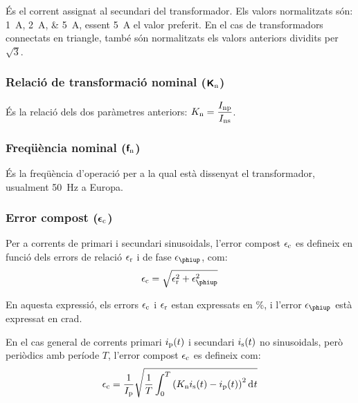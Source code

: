  És el corrent assignat al
secundari del transformador. Els valors normalitzats
són: \qtylist{1;2;5}{A}, essent \qty{5}{A} el valor preferit. En el cas de transformadors connectats en triangle, també són normalitzats els valors anteriors dividits per $ \sqrt{3}$.

\subsubsection{Relació de transformació nominal (${\boldsymbol{\mathsf{K_\text{n}}}}$)}

És la relació dels dos  paràmetres anteriors: $K_\mathrm{n} = \dfrac{I_\mathrm{np}}{I_\mathrm{ns}}$.

\subsubsection{Freqüència nominal (${\boldsymbol{\mathsf{f_\text{n}}}}$)}

 És la freqüència d'operació per a la qual    està dissenyat el transformador, usualment \qty{50}{Hz} a Europa.

\subsubsection{Error compost (${\boldsymbol{\mathsf{\epsilon_\text{c}}}}$)}

Per a corrents de primari i secundari sinusoidals, l'error compost $\epsilon_\mathrm{c}$ es defineix  en funció dels errors de relació $\epsilon_\mathrm{r}$ i de fase  $\epsilon\ped{\phiup}$, com:
\begin{equation}
    \epsilon\ped{c} = \sqrt{\epsilon\ped{r}^2 +  \epsilon\ped{\phiup}^2}
\end{equation}

En aquesta expressió, els errors $\epsilon_\mathrm{c}$ i $\epsilon_\mathrm{r}$  estan expressats en \si{\percent}, i l'error $\epsilon\ped{\phiup}$ està expressat en crad.

En el cas general de corrents primari $i_\mathrm{p}(t)$ i secundari $i_\mathrm{s}(t)$ no sinusoidals, però periòdics amb període $T$, l'error compost $\epsilon_\mathrm{c}$ es defineix com:
\begin{equation}
    \epsilon\ped{c} = \frac{1}{I\ped{p}} \sqrt{\frac{1}{T} \int_0^T \left(K\ped{n} i\ped{s}(t) - i\ped{p}(t)\right)^2 \diff t}
\end{equation}

